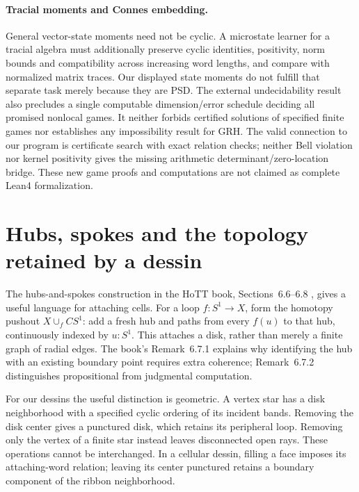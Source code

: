 \documentclass[11pt,oneside,openany]{book}
\theoremstyle{definition}\newtheorem{definition}[theorem]{Definition}
\theoremstyle{remark}\newtheorem{remark}[theorem]{Remark}
\begin{document}
\paragraph{Tracial moments and Connes embedding.}
General vector-state moments need not be cyclic. A microstate learner for a
tracial algebra must additionally preserve cyclic identities, positivity,
norm bounds and compatibility across increasing word lengths, and compare
with normalized matrix traces. Our displayed state moments do not fulfill
that separate task merely because they are PSD. The external undecidability
result \cite{GameMIP} also precludes a single computable dimension/error
schedule deciding all promised nonlocal games. It neither forbids certified
solutions of specified finite games nor establishes any impossibility result
for GRH. The valid connection to our program is certificate search with
exact relation checks; neither Bell violation nor kernel positivity gives
the missing arithmetic determinant/zero-location bridge. These new game
proofs and computations are not claimed as complete Lean4 formalization.

\section{Hubs, spokes and the topology retained by a dessin}
\label{hs:section}
The hubs-and-spokes construction in the HoTT book, Sections~6.6--6.8
\cite{HubsSpokes}, gives a useful language for attaching cells. For a loop
$f:S^1\to X$, form the homotopy pushout
$X\cup_f CS^1$: add a fresh hub and paths from every $f(u)$ to that hub,
continuously indexed by $u:S^1$. This attaches a disk, rather than merely a
finite graph of radial edges. The book's Remark~6.7.1 explains why identifying
the hub with an existing boundary point requires extra coherence;
Remark~6.7.2 distinguishes propositional from judgmental computation.

For our dessins the useful distinction is geometric. A vertex star has a
disk neighborhood with a specified cyclic ordering of its incident bands.
Removing the disk center gives a punctured disk, which retains its peripheral
loop. Removing only the vertex of a finite star instead leaves disconnected
open rays. These operations cannot be interchanged. In a cellular dessin,
filling a face imposes its attaching-word relation; leaving its center
punctured retains a boundary component of the ribbon neighborhood.
\end{document}
